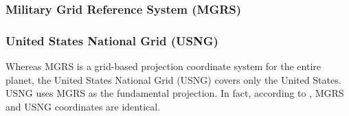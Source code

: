 \subsubsection*{Military Grid Reference System (MGRS)}





\subsubsection*{United States National Grid (USNG)}

Whereas MGRS is a grid-based projection coordinate system for the entire planet, 
the United States National Grid (USNG) covers only the United States.  USNG 
uses MGRS as the fundamental projection.  In fact, according to \cite[p.~3.1]{USNG_Standard},
MGRS and USNG coordinates are identical.


